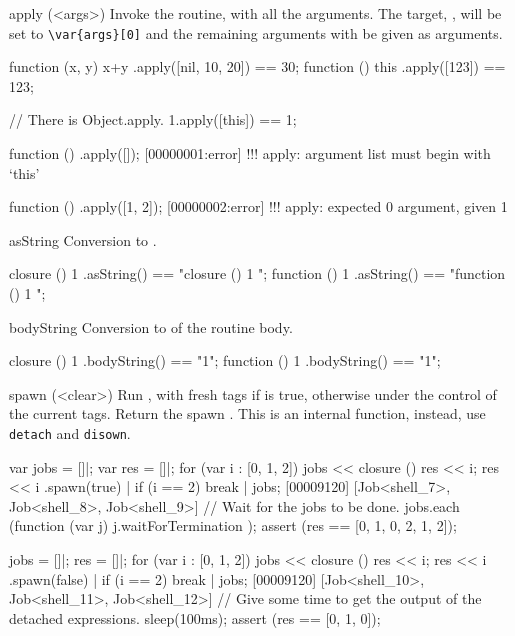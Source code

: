 \begin{urbiscriptapi}
\item[apply](<args>)%
  Invoke the routine, with all the arguments.  The target, \this, will be
  set to \lstinline|\var{args}[0]| and the remaining arguments with be given
  as arguments.
\begin{urbiassert}
function (x, y) { x+y }.apply([nil, 10, 20]) == 30;
function () { this }.apply([123]) == 123;

// There is Object.apply.
1.apply([this]) == 1;
\end{urbiassert}
\begin{urbiscript}
function () {}.apply([]);
[00000001:error] !!! apply: argument list must begin with `this'

function () {}.apply([1, 2]);
[00000002:error] !!! apply: expected 0 argument, given 1
\end{urbiscript}


\item[asString]
  Conversion to .
\begin{urbiassert}
closure  () { 1 }.asString() == "closure () { 1 }";
function () { 1 }.asString() == "function () { 1 }";
\end{urbiassert}


\item[bodyString]
  Conversion to  of the routine body.
\begin{urbiassert}
closure  () { 1 }.bodyString() == "1";
function () { 1 }.bodyString() == "1";
\end{urbiassert}


\item[spawn](<clear>)%
  Run \this, with fresh tags if  is true, otherwise under the
  control of the current tags.  Return the spawn .  This is
  an internal function, instead, use \lstinline|detach| and
  \lstinline|disown|.
\begin{urbiscript}
var jobs = []|;
var res = []|;
for (var i : [0, 1, 2])
{
  jobs << closure () { res << i; res << i }.spawn(true) |
  if (i == 2)
    break
}|
jobs;
[00009120] [Job<shell_7>, Job<shell_8>, Job<shell_9>]
// Wait for the jobs to be done.
jobs.each (function (var j) { j.waitForTermination });
assert (res == [0, 1, 0, 2, 1, 2]);
\end{urbiscript}

\begin{urbiscript}
jobs = []|;
res = []|;
for (var i : [0, 1, 2])
{
  jobs << closure () { res << i; res << i }.spawn(false) |
  if (i == 2)
    break
}|
jobs;
[00009120] [Job<shell_10>, Job<shell_11>, Job<shell_12>]
// Give some time to get the output of the detached expressions.
sleep(100ms);
assert (res == [0, 1, 0]);
\end{urbiscript}
\end{urbiscriptapi}

